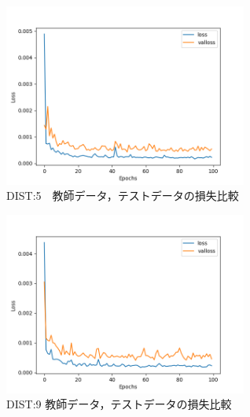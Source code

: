 \documentclass{jreport}		%
\begin{document}
\begin{figure}[htbp]
 \begin{center}
  \includegraphics[width=80mm]{gain5_loss_hikaku.png}
 \end{center}
 \caption{DIST:5　教師データ，テストデータの損失比較}
 \label{fig:one}
\end{figure}

\begin{figure}[htbp]
 \begin{center}
  \includegraphics[width=80mm]{gain10_loss_hikaku.png}
 \end{center}
 \caption{DIST:9 教師データ，テストデータの損失比較}
 \label{fig:one}
\end{figure}
\end{document}
